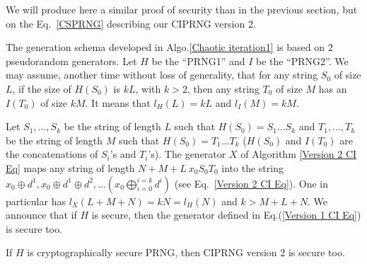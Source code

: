 We will produce here a similar proof of security than in the previous section, 
but on the Eq.~\ref{CSPRNG} describing our CIPRNG version 2.


The generation schema developed in Algo.\ref{Chaotic iteration1} is based on $2$ pseudorandom generators. Let $H$ 
be the ``PRNG1'' and $I$ be the ``PRNG2''. 
We may assume, another time without loss of generality, that for any string $S_0$ of size $L$, if 
the size of $H(S_0)$ is $kL$, with $k > 2$, then any string $T_0$ of size $M$
has an $I(T_0)$ of size $kM$. 
It means that $l_H(L) = kL$ and $l_I(M) = kM$. 


Let $S_1,...,S_k$ be the string of length $L$ such that 
$H(S_0) = S_1 ... S_k$ and $T_1,...,T_k$ be the string of length
$M$ such that $H(S_0) = T_1 ... T_k$ ($H(S_0)$ and $I(T_0)$ are the concatenations of $S_i$'s and $T_i$'s).
The generator $X$ of Algorithm \ref{Version 2 CI Eq} maps any string of length 
$N+M+L~ x_0S_0T_0$ into the string $x_0 \oplus d^1, 
x_0 \oplus d^1 \oplus d^2,... 
(x_0 \bigoplus^{i=k}_{i=0}d^i)$ (see Eq.~\ref{Version 2 CI Eq}).
One in particular has $l_X(L+M+N) = kN = l_H(N)$ and $k > M+L+N$.
We announce that if $H$ is secure, then the generator defined in Eq.(\ref{Version 1 CI Eq}) 
is secure too.

\begin{proposition}
\label{cryptopreuve}
If $H$ is cryptographically secure PRNG, then CIPRNG version 2 is secure too.
\end{proposition}

